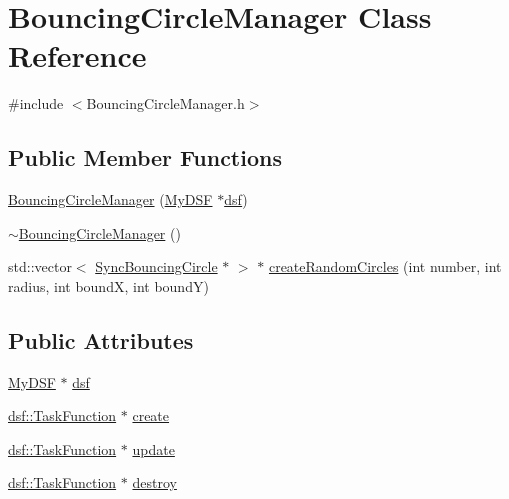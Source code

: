 \hypertarget{class_bouncing_circle_manager}{}\section{Bouncing\+Circle\+Manager Class Reference}
\label{class_bouncing_circle_manager}


{\ttfamily \#include $<$Bouncing\+Circle\+Manager.\+h$>$}

\subsection*{Public Member Functions}
\begin{DoxyCompactItemize}
\item 
\hyperlink{class_bouncing_circle_manager_a03956961ae6a7c55ffccb15928c58802}{Bouncing\+Circle\+Manager} (\hyperlink{class_my_d_s_f}{My\+D\+S\+F} $\ast$\hyperlink{class_bouncing_circle_manager_a4c48cd67fe5ff21396b9e5552d2159a1}{dsf})
\item 
\hyperlink{class_bouncing_circle_manager_afa060fb52ab29a72169af32eb03e39a1}{$\sim$\+Bouncing\+Circle\+Manager} ()
\item 
std\+::vector$<$ \hyperlink{class_sync_bouncing_circle}{Sync\+Bouncing\+Circle} $\ast$ $>$ $\ast$ \hyperlink{class_bouncing_circle_manager_aa88c537cbffc870d5def5bcacd3c5ee2}{create\+Random\+Circles} (int number, int radius, int bound\+X, int bound\+Y)
\end{DoxyCompactItemize}
\subsection*{Public Attributes}
\begin{DoxyCompactItemize}
\item 
\hyperlink{class_my_d_s_f}{My\+D\+S\+F} $\ast$ \hyperlink{class_bouncing_circle_manager_a4c48cd67fe5ff21396b9e5552d2159a1}{dsf}
\item 
\hyperlink{namespacedsf_aa16e735f29587f4485b56fc46746f7a9}{dsf\+::\+Task\+Function} $\ast$ \hyperlink{class_bouncing_circle_manager_a470d50514892c85df73f25358d202d1b}{create}
\item 
\hyperlink{namespacedsf_aa16e735f29587f4485b56fc46746f7a9}{dsf\+::\+Task\+Function} $\ast$ \hyperlink{class_bouncing_circle_manager_a40c60a1170ab1528bf67c86bcc2d7637}{update}
\item 
\hyperlink{namespacedsf_aa16e735f29587f4485b56fc46746f7a9}{dsf\+::\+Task\+Function} $\ast$ \hyperlink{class_bouncing_circle_manager_aee82e3ddd983f4e27c439b74494ab3d5}{destroy}
\end{DoxyCompactItemize}



